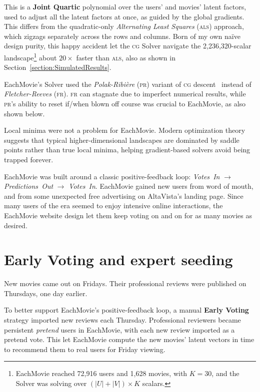 \documentclass[sigconf,authorversion,screen,microtype={protrusion=true,expansion,kerning,spacing}]{acmart}
\begin{document}
This is a \textbf{Joint Quartic} polynomial over the users’ and movies’ latent factors, used to adjust all the latent factors at once, as guided by the global gradients. This differs from the quadratic-only \emph{Alternating Least Squares} (\textsc{als}) approach, which zigzags separately across the rows and columns. Born of my own na{\"i}ve design purity, this happy accident let the \textsc{cg} Solver navigate the 2,236,320-scalar landscape\footnote{EachMovie reached 72,916 users and 1,628 movies, with $K=30$, and the Solver was solving over $(|U| + |V|) \times K$ scalars.} about $20\times$ faster than \textsc{als}, also as shown in Section~\ref{section:SimulatedResults}.

EachMovie's Solver used the \emph{Polak-Ribi\`ere} (\textsc{pr}) variant of \textsc{cg} descent~\cite{shewchuk1994painless} instead of \emph{Fletcher-Reeves} (\textsc{fr}). \textsc{fr} can stagnate due to imperfect numerical results, while \textsc{pr}’s ability to reset if/\allowbreak{}when blown off course was crucial to EachMovie, as also shown below.

Local minima were not a problem for EachMovie. Modern optimization theory~\cite{Dauphinetal2014} suggests that typical higher-dimensional landscapes are dominated by saddle points rather than true local minima, helping gradient-based solvers avoid being trapped forever.

EachMovie was built around a classic positive-feedback loop: \textit{Votes~In} $\to$ \textit{Predictions~Out} $\to$ \textit{Votes~In}. EachMovie gained new users from word of mouth, and from some unexpected free advertising on AltaVista's landing page. Since many users of the era seemed to enjoy intensive online interactions, the EachMovie website design let them keep voting on and on for as many movies as desired.

\section{Early Voting and expert seeding}

New movies came out on Fridays. Their professional reviews were published on Thursdays, one day earlier.

To better support EachMovie's positive-feedback loop, a manual \textbf{Early Voting} strategy imported new reviews each Thursday. Professional reviewers became persistent \textit{pretend} users in EachMovie, with each new review imported as a pretend vote. This let EachMovie compute the new movies' latent vectors in time to recommend them to real users for Friday viewing.
\end{document}
